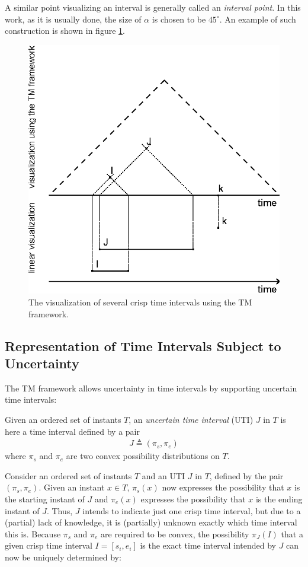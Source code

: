 A similar point visualizing an interval is generally called an \emph{interval point}. In this work, as it is usually done, the size of $\alpha$ is chosen to be $45^{\circ}$. An example of such construction is shown in figure \ref{fig:tm-const-ex}.

\begin{figure}[h]
	\centering
	\includegraphics[width=0.8\columnwidth]{graphs/TM_model_several.eps}
	\caption{The visualization of several crisp time intervals using the TM framework.}
	\label{fig:tm-const-ex}
\end{figure}

\subsection{\label{subsec:tm-interval}Representation of Time Intervals Subject to Uncertainty}
The TM framework allows uncertainty in time intervals by supporting uncertain time intervals:

\begin{definition}
Given an ordered set of instants $T$, an \emph{uncertain time interval} (UTI) $J$ in $T$ is here a time interval defined by a pair
\begin{align}
J \triangleq (\pi_s, \pi_e)
\end{align}
where $\pi_s$ and $\pi_e$ are two convex possibility distributions on $T$.
\end{definition}

Consider an ordered set of instants $T$ and an UTI $J$ in $T$, defined by the pair $(\pi_s, \pi_e)$. Given an instant $x \in T$, $\pi_s(x)$ now expresses the possibility that $x$ is the starting instant of $J$ and $\pi_e(x)$ expresses the possibility that $x$ is the ending instant of $J$. Thus, $J$ intends to indicate just one crisp time interval, but due to a (partial) lack of knowledge, it is (partially) unknown exactly which time interval this is. Because $\pi_s$ and $\pi_e$ are required to be convex, the possibility $\pi_J(I)$ that a given crisp time interval $I = \left[s_i, e_i\right]$ is the exact time interval intended by $J$ can now be uniquely determined by:

